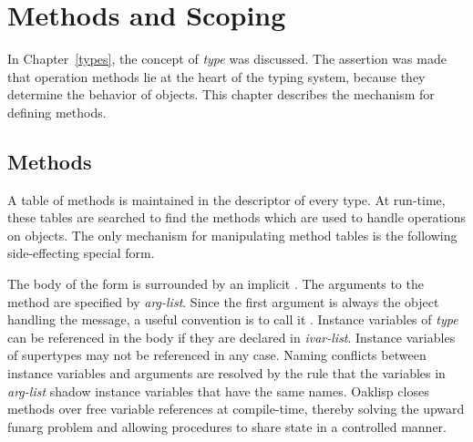 %
%
%


\chapter{Methods and Scoping} \label{methods}

In Chapter~\ref{types}, the concept of \emph{type} was discussed.
The assertion was made that operation methods lie at the heart of the
typing system, because they determine the behavior of objects.  This
chapter describes the mechanism for defining methods.

\section{Methods}

A table of methods is maintained in the descriptor of every type. At
run-time, these tables are searched to find the methods which are used
to handle operations on objects. The only mechanism for manipulating
method tables is the following side-effecting special form.


The body of the form is surrounded by an implicit .  The
arguments to the method are specified by \emph{arg-list}.  Since the
first argument is always the object handling the message, a useful
convention is to call it .  Instance variables of \emph{type}
can be referenced in the body if they are declared in \emph{ivar-list}.
Instance variables of supertypes may not be referenced in any case.
Naming conflicts between instance variables and arguments are resolved
by the rule that the variables in \emph{arg-list} shadow instance
variables that have the same names.  Oaklisp closes methods over free
variable references at compile-time, thereby solving the upward funarg
problem and allowing procedures to share state in a controlled manner.


